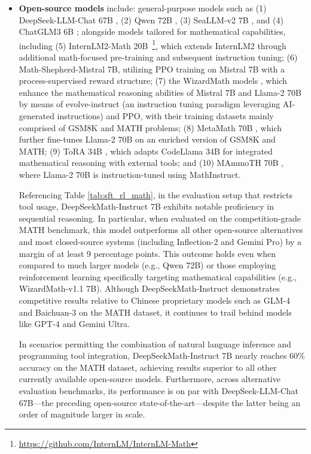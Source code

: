 \begin{itemize}[topsep=0pt]
These models are designed for general applications, and the majority have been subject to various alignment processes. 
    \item \textbf{Open-source models} include: general-purpose models such as (1) DeepSeek-LLM-Chat 67B \citep{deepseek-llm}, (2) Qwen 72B \citep{qwen}, (3) SeaLLM-v2 7B \citep{seallm}, and (4) ChatGLM3 6B \citep{chatglm3}; alongside models tailored for mathematical capabilities, including (5) InternLM2-Math 20B~\footnote{\url{https://github.com/InternLM/InternLM-Math}}, which extends InternLM2 through additional math-focused pre-training and subsequent instruction tuning; (6) Math-Shepherd-Mistral 7B, utilizing PPO training \citep{schulman2017proximal} on Mistral 7B \citep{mistral} with a process-supervised reward structure; (7) the WizardMath models \citep{wizardmath}, which enhance the mathematical reasoning abilities of Mistral 7B and Llama-2 70B \citep{llama2} by means of evolve-instruct (an instruction tuning paradigm leveraging AI-generated instructions) and PPO, with their training datasets mainly comprised of GSM8K and MATH problems; (8) MetaMath 70B \citep{metamath}, which further fine-tunes Llama-2 70B on an enriched version of GSM8K and MATH; (9) ToRA 34B \cite{tora}, which adapts CodeLlama 34B for integrated mathematical reasoning with external tools; and (10) MAmmoTH 70B \citep{MathInstruct}, where Llama-2 70B is instruction-tuned using MathInstruct.

Referencing Table \ref{tab:sft_rl_math}, in the evaluation setup that restricts tool usage, DeepSeekMath-Instruct 7B exhibits notable proficiency in sequential reasoning. In particular, when evaluated on the competition-grade MATH benchmark, this model outperforms all other open-source alternatives and most closed-source systems (including Inflection-2 and Gemini Pro) by a margin of at least 9 percentage points. This outcome holds even when compared to much larger models (e.g., Qwen 72B) or those employing reinforcement learning specifically targeting mathematical capabilities (e.g., WizardMath-v1.1 7B). Although DeepSeekMath-Instruct demonstrates competitive results relative to Chinese proprietary models such as GLM-4 and Baichuan-3 on the MATH dataset, it continues to trail behind models like GPT-4 and Gemini Ultra.

In scenarios permitting the combination of natural language inference and programming tool integration, DeepSeekMath-Instruct 7B nearly reaches 60\% accuracy on the MATH dataset, achieving results superior to all other currently available open-source models. Furthermore, across alternative evaluation benchmarks, its performance is on par with DeepSeek-LLM-Chat 67B—the preceding open-source state-of-the-art—despite the latter being an order of magnitude larger in scale.


\end{itemize}
